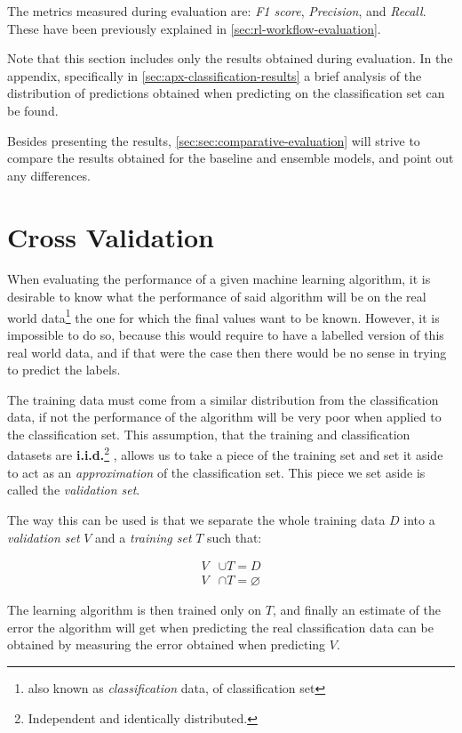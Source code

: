 \documentclass[epsfig,a4paper,11pt,titlepage,twoside,openany]{book}
\begin{document}
The metrics measured during evaluation are: \textit{F1 score}, \textit{Precision}, and \textit{Recall}. These have been previously explained in \autoref{sec:rl-workflow-evaluation}. 

Note that this section includes only the results obtained during evaluation. In the appendix, specifically in \autoref{sec:apx-classification-results} a brief analysis of the distribution of predictions obtained when predicting on the classification set can be found.

Besides presenting the results, \autoref{sec:sec:comparative-evaluation} will strive to compare the results obtained for the baseline and ensemble models, and point out any differences.


\section{Cross Validation}
\label{sec:cross-validation}

When evaluating the performance of a given machine learning algorithm, it is desirable to know what the performance of said algorithm will be on the real world data\footnote{also known as \textit{classification} data, of classification set} the one for which the final values want to be known. However, it is impossible to do so, because this would require to have a labelled version of this real world data, and if that were the case then there would be no sense in trying to predict the labels. 

The training data must come from a similar distribution from the classification data, if not the performance of the algorithm will be very poor when applied to the classification set. This assumption, that the training and classification datasets are \textbf{i.i.d.}\footnote{Independent and identically distributed.} \cite{clauset2011brief}, allows us to take a piece of the training set and set it aside to act as an \textit{approximation} of the classification set. This piece we set aside is called the \textit{validation set}. 

The way this can be used is that we separate the whole training data $D$ into a \textit{validation set} $V$ and a \textit{training set} $T$ such that:

\begin{align*}
    V &\cup T = D \\ 
    V &\cap T = \varnothing
\end{align*}

The learning algorithm is then trained only on $T$, and finally an estimate of the error the algorithm will get when predicting the real classification data can be obtained by measuring the error obtained when predicting $V$. 
\end{document}
